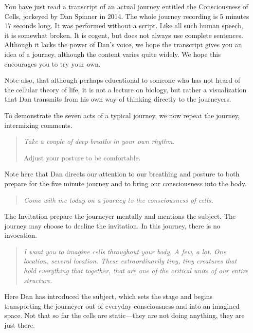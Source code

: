 \documentclass[12pt]{book}
\begin{document}
\hrulefill



You have just read a transcript of an actual journey entitled the
Consciousness of Cells, jockeyed by Dan Spinner in 2014. The
whole journey recording is 5 minutes 17 seconds long. It was
performed without a script. Like all such human speech, it
is somewhat broken. It is cogent, but does not always
use complete sentences. Although it lacks the power of Dan's
voice, we hope the transcript gives you an idea of a journey,
although the content varies quite widely. We hope this
encourages you to try your own.

Note also, that although perhaps educational to someone
who has not heard of the cellular theory of life, it is not
a lecture on biology, but rather a visualization that Dan
transmits from his own way of thinking directly to the journeyers.

To demonstrate the seven acts of a typical journey, we
now repeat the journey, intermixing comments.


\hrulefill

\begin{quote}{\em
Take a couple of deep breaths in your own rhythm.

Adjust your posture to be comfortable.
}
\end{quote}

Note here that Dan directs our attention to our breathing
and posture to both prepare for the five minute journey
and to bring our consciousness into the body.

\begin{quote}{\em
  Come with me today on a journey to the consciousness of cells.
}\end{quote}

The Invitation prepare the journeyer mentally and mentions
the subject. The journey may choose to decline the invitation.
In this journey, there is no invocation.
\begin{quote}{\em
I want you to imagine
cells throughout your body. A few, a lot. One location, several location.
These extraordinarily tiny, tiny creatures that
hold everything that together, that
are one of the critical units of our entire structure.
}\end{quote}

Here Dan has introduced the subject, which sets the stage and
begins transporting the journeyer out of everyday consciousness
and into an imagined space. Not that so far the cells are
static---they are not doing anything, they are just there.
\end{document}
